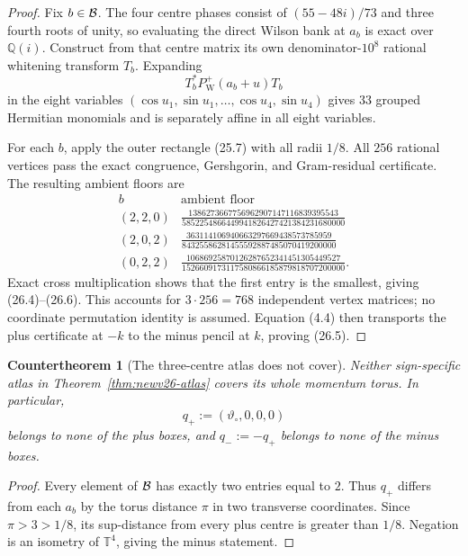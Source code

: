 \documentclass[11pt,oneside]{article}
\newtheorem{countertheorem}[theorem]{Countertheorem}
\theoremstyle{definition}
\theoremstyle{remark}
\begin{document}
\begin{proof}
Fix \(b\in{\cal B}\).  The four centre phases consist of
\((55-48i)/73\) and three fourth roots of unity, so evaluating the
direct Wilson bank at \(a_b\) is exact over \(\mathbb Q(i)\).
Construct from that centre matrix its own denominator-\(10^8\)
rational whitening transform \(T_b\).  Expanding
\[
 T_b^*P_{\mathrm W}^+(a_b+u)T_b                         \tag{26.7}
\]
in the eight variables
\((\cos u_1,\sin u_1,\ldots,\cos u_4,\sin u_4)\) gives
\(33\) grouped Hermitian monomials and is separately affine in all
eight variables.

For each \(b\), apply the outer rectangle (25.7) with all radii
\(1/8\).  All \(256\) rational vertices pass the exact congruence,
Gershgorin, and Gram-residual certificate.  The resulting ambient
floors are
\[
\begin{array}{c|c}
b&\text{ambient floor}\\ \hline
(2,2,0)&
\displaystyle
\frac{1386273667756962907147116839395543}
{5852254866449941826427421384231680000}\\[6pt]
(2,0,2)&
\displaystyle
\frac{363114106940663297669438573785959}
{84325586281455592887485070419200000}\\[6pt]
(0,2,2)&
\displaystyle
\frac{10686925870126287652341451305449527}
{1526609173117580866185879818707200000}.
\end{array}                                             \tag{26.8}
\]
Exact cross multiplication shows that the first entry is the
smallest, giving (26.4)--(26.6).  This accounts for
\(3\cdot256=768\) independent vertex matrices; no coordinate
permutation identity is assumed.  Equation (4.4) then transports the
plus certificate at \(-k\) to the minus pencil at \(k\), proving
(26.5).
\end{proof}

\begin{countertheorem}[The three-centre atlas does not cover]
\label{ctr:newv26-no-cover}
Neither sign-specific atlas in Theorem~\ref{thm:newv26-atlas}
covers its whole momentum torus.  In particular,
\[
 q_+:=(\vartheta_\circ,0,0,0)                            \tag{26.9}
\]
belongs to none of the plus boxes, and
\(q_-:=-q_+\) belongs to none of the minus boxes.
\end{countertheorem}

\begin{proof}
Every element of \({\cal B}\) has exactly two entries equal to \(2\).
Thus \(q_+\) differs from each \(a_b\) by the torus distance \(\pi\)
in two transverse coordinates.  Since \(\pi>3>1/8\), its
sup-distance from every plus centre is greater than \(1/8\).
Negation is an isometry of \(\mathbb T^4\), giving the minus
statement.
\end{proof}
\end{document}
